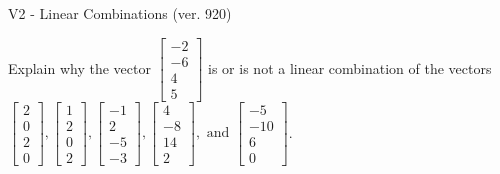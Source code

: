 \begin{exercise}
  \begin{exerciseTitle}V2 - Linear Combinations (ver. 920)\end{exerciseTitle}
  \begin{exerciseStatement}
    Explain why the vector \(\left[\begin{array}{c}
-2 \\
-6 \\
4 \\
5
\end{array}\right]\)  is or is not a linear 
	combination of the vectors \(\left[\begin{array}{c}
2 \\
0 \\
2 \\
0
\end{array}\right] , \left[\begin{array}{c}
1 \\
2 \\
0 \\
2
\end{array}\right] , \left[\begin{array}{c}
-1 \\
2 \\
-5 \\
-3
\end{array}\right] , \left[\begin{array}{c}
4 \\
-8 \\
14 \\
2
\end{array}\right] , \text{ and } \left[\begin{array}{c}
-5 \\
-10 \\
6 \\
0
\end{array}\right]\).
	



\end{exerciseStatement}
\end{exercise}
